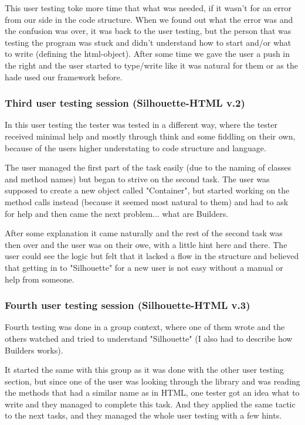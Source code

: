 \documentclass[12pt]{article}
\begin{document}
        This user testing toke more time that what was needed, if it wasn’t for an error from our side in the code structure. When we found out what the error was and the confusion was over, it was back to the user testing, but the person that was testing the program was stuck and didn’t understand how to start and/or what to write (defining the html-object). After some time we gave the user a push in the right and the user started to type/write like it was natural for them or as the hade used our framework before.

        \subsubsection{Third user testing session (Silhouette-HTML v.2)}

        In this user testing the tester was tested in a different way, where the tester received minimal help and mostly through think and some fiddling on their own, because of the users higher understating to code structure and language.

        The user managed the first part of the task easily (due to the naming of classes and method names) but began to strive on the second task. The user was supposed to create a new object called "Container", but started working on the method calls instead (because it seemed most natural to them) and had to ask for help and then came the next problem... what are Builders.

        After some explanation it came naturally and the rest of the second task was then over and the user was on their owe, with a little hint here and there. The user could see the logic but felt that it lacked a flow in the structure and believed that getting in to "Silhouette" for a new user is not easy without a manual or help from someone.
        
        \subsubsection{Fourth user testing session (Silhouette-HTML v.3)}

        Fourth testing was done in a group context, where one of them wrote and the others watched and tried to understand "Silhouette" (I also had to describe how Builders works).

        It started the same with this group as it was done with the other user testing section, but since one of the user was looking through the library and was reading the methods that had a similar name as in HTML, one tester got an idea what to write and they managed to complete this task. And they applied the same tactic to the next tasks, and they managed the whole user testing with a few hints. 
\end{document}
